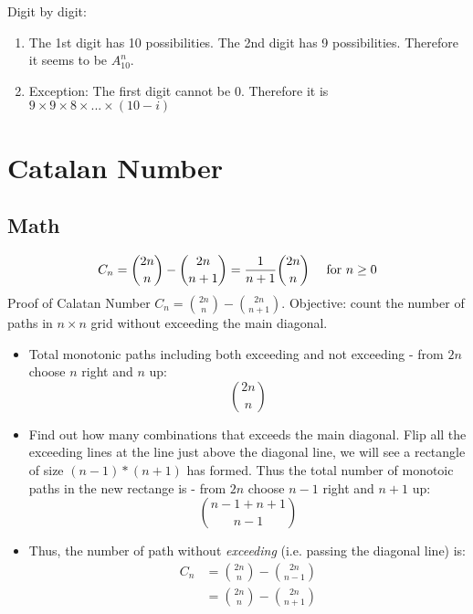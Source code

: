 Digit by digit: 
\begin{enumerate}
\item The 1st digit has 10 possibilities. The 2nd digit has 9 possibilities. Therefore it seems to be $A_{10}^n$.
\item Exception: The first digit cannot be 0. Therefore it is $9\times 9\times 8\times ...\times (10-i)$
\end{enumerate}



\section{Catalan Number}\label{section:catalanNumber}
\subsection{Math}
$$
C_n = {2n\choose n} - {2n\choose n+1} = {1\over n+1}{2n\choose n} \quad\text{ for }n\ge 0
$$
 Proof of Calatan Number $C_n ={2n\choose n} - {2n\choose n+1}$. Objective: count the number of paths in $n\times n$ grid without exceeding the main diagonal. 
\begin{itemize}
\begin{figure}[]
    \centerline{\texttt{[image: catalan\_proof]}}
    \caption{Monotonic Paths}
  \label{fig:catalanProof}
\end{figure}
\item Total monotonic paths including both exceeding and not exceeding - from $2n$ choose $n$ right and $n$ up:
$$
{2n\choose n}
$$
\item Find out how many combinations that exceeds the main diagonal. Flip all the exceeding lines at the line just above the diagonal line, we will see a rectangle of size $(n-1) * (n+1)$ has formed. Thus the total number of monotoic paths in the new rectange is - from $2n$ choose $n-1$ right and $n+1$ up:
$$
{n-1+n+1\choose n-1}
$$
\item Thus, the number of path without \textit{exceeding} (i.e. passing the diagonal line) is: 
\begin{align*}
C_n &= {2n\choose n} - {2n\choose n-1}\\ 
&={2n\choose n} - {2n\choose n+1}
\end{align*}
\end{itemize}

